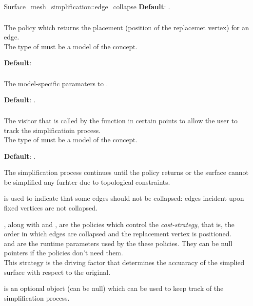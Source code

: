 \begin{ccRefFunction}{Surface_mesh_simplification::edge_collapse}
\textbf{Default}: .

\subsubsection{}

The policy which returns the placement (position of the replacemet vertex)
for an edge.\\
The type of  must be a model of the  concept.

\textbf{Default}: 

\subsubsection{}

The model-specific paramaters to .

\textbf{Default}: .

\subsubsection{}

The visitor that is called by the  function
in certain points to allow the user to track the simplificatioin process.\\
The type of  must be a model of the  concept.

\textbf{Default}: .


The simplification process continues until the  policy returns 
or the surface cannot be simplified any furhter due to topological constraints.

 is used to indicate that some edges should not be
collapsed: edges incident upon fixed vertices are not collapsed.

, along with  and ,
are the policies which control the {\em cost-strategy}, that is, 
the order in which edges are collapsed and the replacement vertex is positioned.\\
 and  are the runtime 
parameters used by the these policies. They can be null pointers
if the policies don't need them.\\
This strategy is the driving factor that determines the accuaracy of the
simplied surface with respect to the original.

 is an optional object (can be null) which can be used
to keep track of the simplification process.

\end{ccRefFunction}



